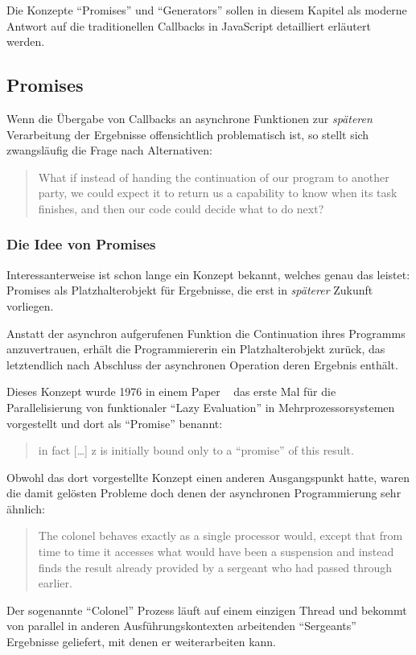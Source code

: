 \documentclass[
11pt, %
a4paper, %
oneside, %
pdfspacing, %
headinclude,
BCOR5mm, %
ngerman, %
bibtotocnumbered,
]{scrartcl}
\begin{document}
	Die Konzepte "`Promises"' und "`Generators"' sollen in diesem Kapitel als moderne Antwort auf die traditionellen Callbacks in JavaScript detailliert erläutert werden.

	\subsection{Promises}
	
	Wenn die Übergabe von Callbacks an asynchrone Funktionen zur \emph{späteren} Verarbeitung der Ergebnisse offensichtlich problematisch ist, so stellt sich zwangsläufig die Frage nach Alternativen:
	
	\begin{quote}What if instead of handing the continuation of our program to another party, we could expect it to return us a capability to know when its task finishes, and then our code could decide what to do next?~\citep[S.~39]{Simpson.2015}\end{quote}
	
		\subsubsection{Die Idee von Promises}
			Interessanterweise ist schon lange ein Konzept bekannt, welches genau das leistet: Promises als Platzhalterobjekt für Ergebnisse, die erst in \textit{späterer} Zukunft vorliegen.
			
			Anstatt der asynchron aufgerufenen Funktion die Continuation ihres Programms anzuvertrauen, erhält die Programmiererin ein Platzhalterobjekt zurück, das letztendlich nach Abschluss der asynchronen Operation deren Ergebnis enthält.
			
			Dieses Konzept wurde 1976 in einem Paper ~\citep[S.~263]{Friedman.1976} das erste Mal für die Parallelisierung von funktionaler "`Lazy Evaluation"' in Mehrprozessorsystemen vorgestellt und dort als "`Promise"' benannt: 
			
			\begin{quote}in fact [\ldots] z is initially bound only to a "`promise"' of this result.~\citep[S.~268]{Friedman.1976}\end{quote} 
			
			Obwohl das dort vorgestellte Konzept einen anderen Ausgangspunkt hatte, waren die damit gelösten Probleme doch denen der asynchronen Programmierung sehr ähnlich:
			
			\begin{quote}
				The colonel behaves exactly as a single processor would, except that from time to time it accesses what would have been a suspension and instead finds the result already provided by a sergeant who had passed through earlier.~\citep[S.~269]{Friedman.1976}
			\end{quote} 
			Der sogenannte "`Colonel"' Prozess läuft auf einem einzigen Thread und bekommt von parallel in anderen Ausführungskontexten arbeitenden "`Sergeants"' Ergebnisse geliefert, mit denen er weiterarbeiten kann.
			
\end{document}
